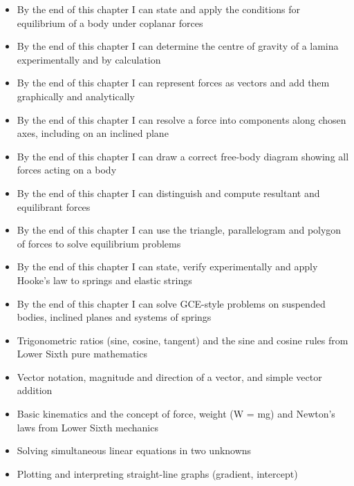 \documentclass[11pt]{article}
\begin{document}
\begin{objectifs}
\begin{itemize}
\item By the end of this chapter I can state and apply the conditions for equilibrium of a body under coplanar forces
\item By the end of this chapter I can determine the centre of gravity of a lamina experimentally and by calculation
\item By the end of this chapter I can represent forces as vectors and add them graphically and analytically
\item By the end of this chapter I can resolve a force into components along chosen axes, including on an inclined plane
\item By the end of this chapter I can draw a correct free-body diagram showing all forces acting on a body
\item By the end of this chapter I can distinguish and compute resultant and equilibrant forces
\item By the end of this chapter I can use the triangle, parallelogram and polygon of forces to solve equilibrium problems
\item By the end of this chapter I can state, verify experimentally and apply Hooke's law to springs and elastic strings
\item By the end of this chapter I can solve GCE-style problems on suspended bodies, inclined planes and systems of springs
\end{itemize}
\end{objectifs}

\begin{prerequis}
\begin{itemize}
\item Trigonometric ratios (sine, cosine, tangent) and the sine and cosine rules from Lower Sixth pure mathematics
\item Vector notation, magnitude and direction of a vector, and simple vector addition
\item Basic kinematics and the concept of force, weight (W = mg) and Newton's laws from Lower Sixth mechanics
\item Solving simultaneous linear equations in two unknowns
\item Plotting and interpreting straight-line graphs (gradient, intercept)
\end{itemize}
\end{prerequis}

\newpage
\end{document}
